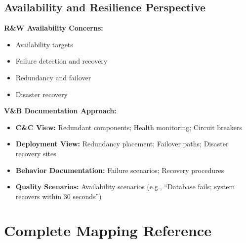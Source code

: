 \documentclass[11pt]{article}
\begin{document}
\subsection{Availability and Resilience Perspective}

\begin{perspbox}
\textbf{R\&W Availability Concerns:}
\begin{itemize}[nosep]
    \item Availability targets
    \item Failure detection and recovery
    \item Redundancy and failover
    \item Disaster recovery
\end{itemize}

\textbf{V\&B Documentation Approach:}
\begin{itemize}
    \item \textbf{C\&C View:} Redundant components; Health monitoring; Circuit breakers
    \item \textbf{Deployment View:} Redundancy placement; Failover paths; Disaster recovery sites
    \item \textbf{Behavior Documentation:} Failure scenarios; Recovery procedures
    \item \textbf{Quality Scenarios:} Availability scenarios (e.g., ``Database fails; system recovers within 30 seconds'')
\end{itemize}
\end{perspbox}

\section{Complete Mapping Reference}
\end{document}

